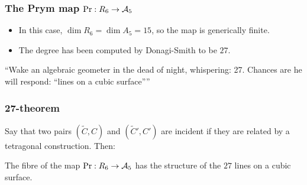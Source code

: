 \begin{frame}
\frametitle{The Prym map $\mathrm{Pr}:R_6 \to \mathcal{A}_5$}

\begin{itemize}
	\item In this case, $\dim R_6 = \dim A_5 = 15$, so the map is generically finite.
	\pause
	\item The degree has  been computed by Donagi-Smith to be $27$.
\end{itemize}

\pause

\begin{center}
\Large{``}Wake an algebraic geometer in the dead of night, whispering: 27. Chances are he will respond: ``lines on a cubic surface''\Large{''}
\end{center}

\end{frame}

\begin{frame}
\frametitle{27-theorem}

Say that two pairs $(\widetilde C, C)$ and $(\widetilde C', C')$ are \alert{incident} if they are related by a tetragonal construction. Then:


\begin{theorem}
The fibre of the map $\mathrm{Pr}: R_6 \to \mathcal{A}_5$ has the structure of the $27$ lines on a cubic surface.
\end{theorem}

\end{frame}